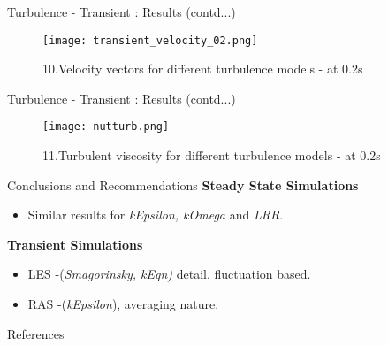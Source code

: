 \documentclass [xcolor=svgnames, t] {beamer}
\begin{document}
\begin{frame}{Turbulence - Transient : Results (contd...)}
    
    \begin{figure}
    \centering
    \texttt{[image: transient\_velocity\_02.png]}
    \caption{10.Velocity vectors for different turbulence models - at
0.2s}
\end{figure}
    
\end{frame}

\begin{frame}{Turbulence - Transient : Results (contd...)}
    
    \begin{figure}
    \centering
    \texttt{[image: nutturb.png]}
    \caption{11.Turbulent viscosity for different turbulence models - at
0.2s}
\end{figure}
    
\end{frame}

\begin{frame}{Conclusions and Recommendations}
\textbf{Steady State Simulations}
\begin{itemize}
    \item Similar results for  \textit{kEpsilon, kOmega}\,\,and \textit{LRR}.
    
\end{itemize}
\textbf{Transient Simulations}
\begin{itemize}
    \item LES -(\textit{Smagorinsky, kEqn)} detail, fluctuation based.
    \item RAS -(\textit{kEpsilon}), averaging nature.
\end{itemize}
    
\end{frame}
\begin{frame}{References}
   \printbibliography
\end{frame}
\end{document}
